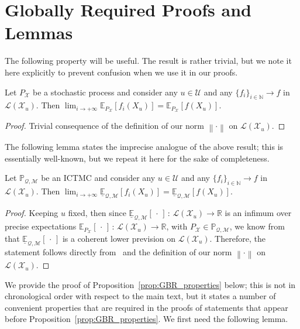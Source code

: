 \documentclass[twoside,11pt]{article}
\newcommand{\nats}{\mathbb{N}}
\newcommand{\reals}{\mathbb{R}}
\newcommand{\states}{\mathcal{X}}
\newcommand{\lexp}{\underline{\mathbb{E}}_{\rateset,\mathcal{M}}}
\newcommand{\gambles}{\mathcal{L}}
\newcommand{\rateset}{\mathcal{Q}}
\newcommand{\norm}[1]{\left\lVert #1 \right\rVert}
\begin{document}
\section{Globally Required Proofs and Lemmas}

The following property will be useful. The result is rather trivial, but we note it here explicitly to prevent confusion when we use it in our proofs.
\begin{lemma}\label{lemma:limit_exp_is_exp_limit}
Let $P_\states$ be a stochastic process and consider any $u\in\mathcal{U}$ and any $\{f_i\}_{i\in\nats}\to f$ in $\gambles(\states_u)$. Then $\lim_{i\to+\infty}\mathbb{E}_{P_\states}[f_i(X_u)]=\mathbb{E}_{P_\states}[f(X_u)]$.
\end{lemma}
\begin{proof}
Trivial consequence of the definition of our norm $\norm{\cdot}$ on $\gambles(\states_u)$.
\end{proof}

The following lemma states the imprecise analogue of the above result; this is essentially well-known, but we repeat it here for the sake of completeness.

\begin{lemma}\label{lemma:limit_lexp_is_lexp_limit}
Let $\mathbb{P}_{\rateset,\mathcal{M}}$ be an ICTMC and consider any $u\in\mathcal{U}$ and any $\{f_i\}_{i\in\nats}\to f$ in $\gambles(\states_u)$. Then $\lim_{i\to+\infty}\lexp[f_i(X_u)]=\lexp[f(X_u)]$.
\end{lemma}
\begin{proof}
Keeping $u$ fixed, then since $\lexp[\,\cdot\,]\,:\,\gambles(\states_u)\to\reals$ is an infimum over precise expectations $\mathbb{E}_{P_\states}[\,\cdot\,]\,:\,\gambles(\states_u)\to\reals$, with $P_\states\in\mathbb{P}_{\rateset,\mathcal{M}}$, we know from~\cite[Theorem 3.3.3]{Walley:1991vk} that $\lexp[\,\cdot\,]$ is a coherent lower prevision on $\gambles(\states_u)$. Therefore, the statement follows directly from~\cite[Proposition 2.6.1.$\ell$]{Walley:1991vk} and the definition of our norm $\norm{\cdot}$ on $\gambles(\states_u)$.
\end{proof}


We provide the proof of Proposition~\ref{prop:GBR_properties} below; this is not in chronological order with respect to the main text, but it states a number of convenient properties that are required in the proofs of statements that appear before Proposition~\ref{prop:GBR_properties}. We first need the following lemma.
\end{document}
